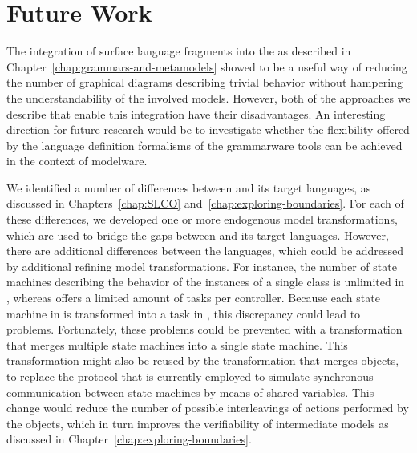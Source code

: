 \section{Future Work}
\label{sec:conclusions:future-work}


The integration of surface language fragments into the \UML as described in Chapter~\ref{chap:grammars-and-metamodels} showed to be a useful way of reducing the number of graphical diagrams describing trivial behavior without hampering the understandability of the involved models.
However, both of the approaches we describe that enable this integration have their disadvantages.
An interesting direction for future research would be to investigate whether the flexibility offered by the language definition formalisms of the grammarware tools can be achieved in the context of modelware.

We identified a number of differences between \SLCO and its target languages, as discussed in Chapters~\ref{chap:SLCO} and~\ref{chap:exploring-boundaries}.
For each of these differences, we developed one or more endogenous model transformations, which are used to bridge the gaps between \SLCO and its target languages.
However, there are additional differences between the languages, which could be addressed by additional refining model transformations.
For instance, the number of state machines describing the behavior of the instances of a single class is unlimited in \SLCO, whereas \NQC offers a limited amount of tasks per controller.
Because each state machine in \SLCO is transformed into a task in \NQC, this discrepancy could lead to problems.
Fortunately, these problems could be prevented with a transformation that merges multiple state machines into a single state machine.
This transformation might also be reused by the transformation that merges objects, to replace the protocol that is currently employed to simulate synchronous communication between state machines by means of shared variables.
This change would reduce the number of possible interleavings of actions performed by the objects, which in turn improves the verifiability of intermediate models as discussed in Chapter~\ref{chap:exploring-boundaries}.




